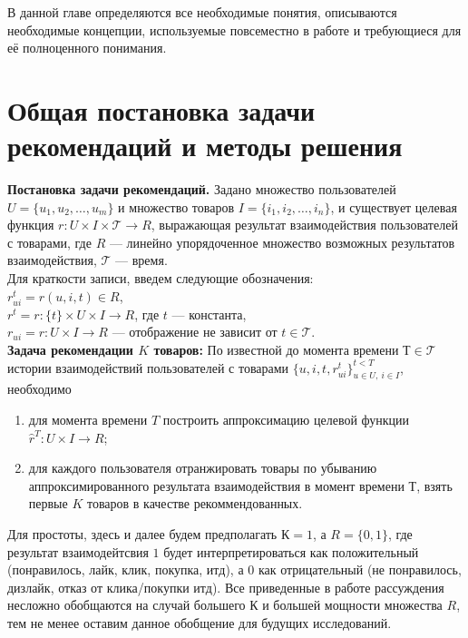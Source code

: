 \documentclass[a4paper,14pt,oneside]{mipt-thesis-ms}
\begin{document}
В данной главе определяются все необходимые понятия, описываются необходимые концепции, используемые повсеместно в работе и требующиеся для её полноценного понимания.


\section{Общая постановка задачи рекомендаций и методы решения}
{\bf Постановка задачи рекомендаций.} 
Задано множество пользователей $U = \{u_1, u_2, \dots, u_m\}$ и множество товаров $I = \{i_1, i_2, \dots, i_n\}$, и существует целевая функция $r: U \times I \times \mathcal{T} \rightarrow R$, выражающая результат взаимодействия пользователей с товарами, где $R$ --- линейно упорядоченное множество возможных результатов взаимодействия, $\mathcal{T}$ --- время.\cite{peng01}\\

Для краткости записи, введем следующие обозначения: \\
$r^t_{ui} = r(u, i, t) \in R$, \\
$r^t = r:\{t\} \times U \times I \rightarrow R$, где $t$ --- константа, \\
$r_{ui} = r: U \times I \rightarrow R$ --- отображение не зависит от $t \in \mathcal{T}$.\\

{\bf Задача рекомендации $K$ товаров:} По известной до момента времени $Т \in \mathcal{T}$ истории взаимодействий пользователей с товарами $\{u, i, t, r_{ui}^t\}^{t<T}_{u \in U,\:i \in I}$, необходимо 
\begin{enumerate}
    \item для момента времени $T$ построить аппроксимацию целевой функции $\hat r^T: U \times I \rightarrow R$;
    \item для каждого пользователя отранжировать товары по убыванию аппроксимированного результата взаимодействия в момент времени $Т$, взять первые $K$ товаров в качестве рекоммендованных.
\end{enumerate}

Для простоты, здесь и далее будем предполагать $К = 1$, а $R = \{0, 1\}$, где результат взаимодейтсвия $1$ будет интерпретироваться как положительный (понравилось, лайк, клик, покупка, итд), а $0$ как отрицательный (не понравилось, дизлайк, отказ от клика/покупки итд). Все приведенные в работе рассуждения несложно обобщаются на случай большего $К$ и большей мощности множества $R$, тем не менее оставим данное обобщение для будущих исследований.\\
\end{document}
